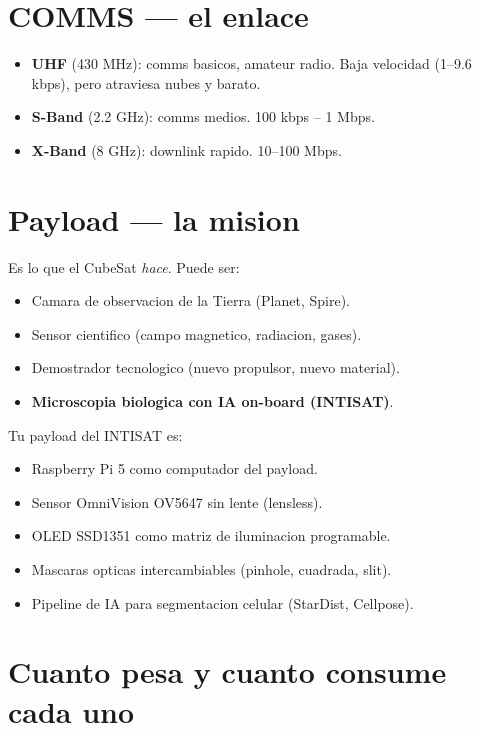 \documentclass[11pt,a4paper,oneside,openright]{book}
\begin{document}
\section{COMMS --- el enlace}

\begin{itemize}[leftmargin=2em]
  \item \textbf{UHF} (430 MHz): comms basicos, amateur radio. Baja velocidad
        (1--9.6 kbps), pero atraviesa nubes y barato.
  \item \textbf{S-Band} (2.2 GHz): comms medios. 100 kbps -- 1 Mbps.
  \item \textbf{X-Band} (8 GHz): downlink rapido. 10--100 Mbps.
\end{itemize}

\section{Payload --- la mision}

Es lo que el CubeSat \emph{hace}. Puede ser:
\begin{itemize}[leftmargin=2em]
  \item Camara de observacion de la Tierra (Planet, Spire).
  \item Sensor cientifico (campo magnetico, radiacion, gases).
  \item Demostrador tecnologico (nuevo propulsor, nuevo material).
  \item \textbf{Microscopia biologica con IA on-board (INTISAT)}.
\end{itemize}

\begin{payload}
Tu payload del INTISAT es:
\begin{itemize}[leftmargin=1em]
  \item Raspberry Pi 5 como computador del payload.
  \item Sensor OmniVision OV5647 sin lente (lensless).
  \item OLED SSD1351 como matriz de iluminacion programable.
  \item Mascaras opticas intercambiables (pinhole, cuadrada, slit).
  \item Pipeline de IA para segmentacion celular (StarDist, Cellpose).
\end{itemize}
\end{payload}

\section{Cuanto pesa y cuanto consume cada uno}
\end{document}
